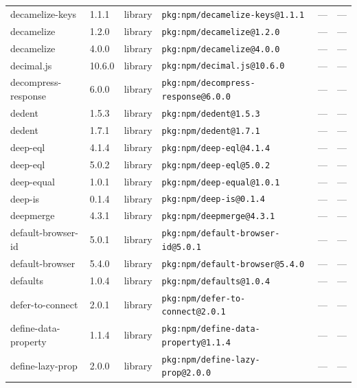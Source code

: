 \documentclass[11pt,a4paper]{article}
\begin{document}
\begin{longtable}{|p{4cm}|p{2cm}|p{1.6cm}|p{5cm}|p{1.5cm}|p{3.5cm}|}
\raggedright decamelize-keys & 1.1.1 & library & \small\texttt{pkg:npm/decamelize-keys@1.1.1} & — & \small — \\
\raggedright decamelize & 1.2.0 & library & \small\texttt{pkg:npm/decamelize@1.2.0} & — & \small — \\
\raggedright decamelize & 4.0.0 & library & \small\texttt{pkg:npm/decamelize@4.0.0} & — & \small — \\
\raggedright decimal.js & 10.6.0 & library & \small\texttt{pkg:npm/decimal.js@10.6.0} & — & \small — \\
\raggedright decompress-response & 6.0.0 & library & \small\texttt{pkg:npm/decompress-response@6.0.0} & — & \small — \\
\raggedright dedent & 1.5.3 & library & \small\texttt{pkg:npm/dedent@1.5.3} & — & \small — \\
\raggedright dedent & 1.7.1 & library & \small\texttt{pkg:npm/dedent@1.7.1} & — & \small — \\
\raggedright deep-eql & 4.1.4 & library & \small\texttt{pkg:npm/deep-eql@4.1.4} & — & \small — \\
\raggedright deep-eql & 5.0.2 & library & \small\texttt{pkg:npm/deep-eql@5.0.2} & — & \small — \\
\raggedright deep-equal & 1.0.1 & library & \small\texttt{pkg:npm/deep-equal@1.0.1} & — & \small — \\
\raggedright deep-is & 0.1.4 & library & \small\texttt{pkg:npm/deep-is@0.1.4} & — & \small — \\
\raggedright deepmerge & 4.3.1 & library & \small\texttt{pkg:npm/deepmerge@4.3.1} & — & \small — \\
\raggedright default-browser-id & 5.0.1 & library & \small\texttt{pkg:npm/default-browser-id@5.0.1} & — & \small — \\
\raggedright default-browser & 5.4.0 & library & \small\texttt{pkg:npm/default-browser@5.4.0} & — & \small — \\
\raggedright defaults & 1.0.4 & library & \small\texttt{pkg:npm/defaults@1.0.4} & — & \small — \\
\raggedright defer-to-connect & 2.0.1 & library & \small\texttt{pkg:npm/defer-to-connect@2.0.1} & — & \small — \\
\raggedright define-data-property & 1.1.4 & library & \small\texttt{pkg:npm/define-data-property@1.1.4} & — & \small — \\
\raggedright define-lazy-prop & 2.0.0 & library & \small\texttt{pkg:npm/define-lazy-prop@2.0.0} & — & \small — \\

\end{longtable}
\end{document}
